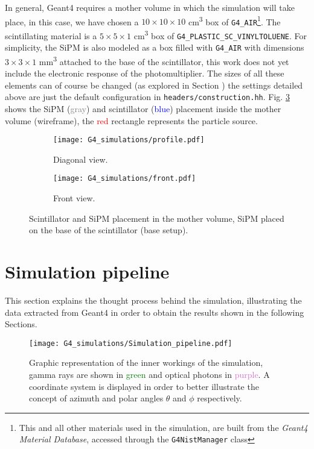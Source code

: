 In general, Geant4 requires a mother volume in which the simulation will take place, in this case, we have chosen a $10\times10\times10$ \unit{\cm\cubed} box of \texttt{G4\_AIR}\footnote{This and all other materials used in the simulation, are built from the \textit{Geant4 Material Database}, accessed through the \texttt{G4NistManager} class}. The scintillating material is a $5\times5\times1$ \unit{\cm\cubed} box of \texttt{G4\_PLASTIC\_SC\_VINYLTOLUENE}. For simplicity, the SiPM is also modeled as a box filled with \texttt{G4\_AIR} with dimensions $3\times3\times1$ \unit{\mm\cubed} attached to the base of the scintillator, this work does not yet include the electronic response of the photomultiplier. The sizes of all these elements can of course be changed (as explored in Section ) the settings detailed above are just the default configuration in \texttt{headers/construction.hh}. Fig. \ref{fig:geometry} shows the SiPM (\textcolor{Gray}{gray}) and scintillator (\textcolor{blue}{blue}) placement inside the mother volume (wireframe), the \textcolor{red}{red} rectangle represents the particle source.

\begin{figure}[H]
  \centering
  \begin{subfigure}[t]{0.48\textwidth}
    \texttt{[image: G4\_simulations/profile.pdf]}
    \caption{\label{sfig:geometry_profile}Diagonal view.}
  \end{subfigure}
  \hfill
  \begin{subfigure}[t]{0.48\textwidth}
    \texttt{[image: G4\_simulations/front.pdf]}
    \caption{\label{sfig:geometry_front}Front view.}
  \end{subfigure}
  \caption{\label{fig:geometry}Scintillator and SiPM placement in the mother volume, SiPM placed on the base of the scintillator (base setup).}
\end{figure}

\section{Simulation pipeline}

This section explains the thought process behind the simulation, illustrating the data extracted from Geant4 in order to obtain the results shown in the following Sections.

\begin{figure}[H]
  \centering
    \texttt{[image: G4\_simulations/Simulation\_pipeline.pdf]}
  \caption{\label{fig:sim_pipeline}Graphic representation of the inner workings of the simulation, gamma rays are shown in \textcolor{green}{green} and optical photons in \textcolor{Orchid}{purple}. A coordinate system is displayed in order to better illustrate the concept of azimuth and polar angles $\theta$ and $\phi$ respectively.}
\end{figure}

